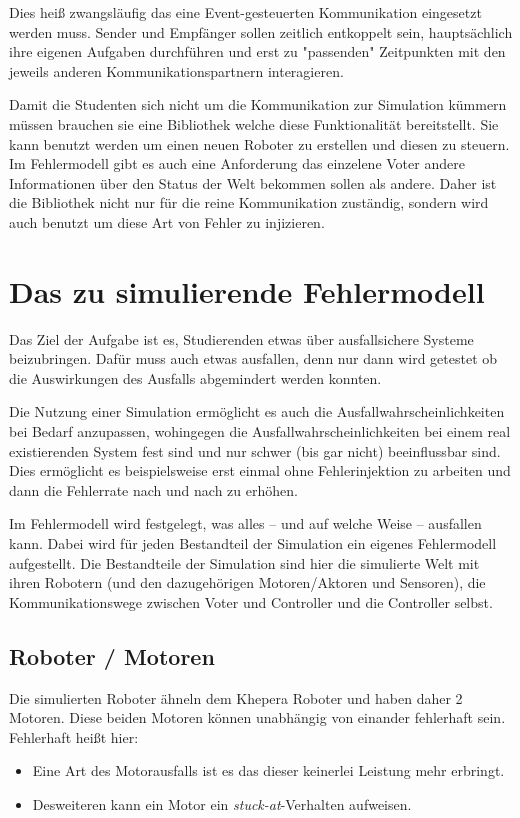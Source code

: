 Dies hei{\ss} zwangsl{\"{a}}ufig das eine Event-gesteuerten Kommunikation eingesetzt werden muss. Sender und Empf{\"{a}}nger
sollen zeitlich entkoppelt sein, haupts{\"{a}}chlich ihre eigenen Aufgaben durchf{\"{u}}hren und erst zu "passenden" Zeitpunkten
mit den jeweils anderen Kommunikationspartnern interagieren. 

Damit die Studenten sich nicht um die Kommunikation zur Simulation k{\"{u}}mmern m{\"{u}}ssen brauchen sie eine Bibliothek welche
diese Funktionalit{\"{a}}t bereitstellt. Sie kann benutzt werden um einen neuen Roboter zu erstellen und diesen zu steuern.
Im Fehlermodell gibt es auch eine Anforderung das einzelene Voter andere Informationen {\"{u}}ber den Status der Welt
bekommen sollen als andere. Daher ist die Bibliothek nicht nur f{\"{u}}r die reine Kommunikation zust{\"{a}}ndig, sondern wird auch
benutzt um diese Art von Fehler zu injizieren.

\clearpage
\section{Das zu simulierende Fehlermodell}\label{fm}
Das Ziel der Aufgabe ist es, Studierenden etwas {\"{u}}ber ausfallsichere Systeme beizubringen. Daf{\"{u}}r
muss auch etwas ausfallen, denn nur dann wird getestet ob die Auswirkungen des Ausfalls abgemindert werden 
konnten.

Die Nutzung einer Simulation erm{\"{o}}glicht es auch die Ausfallwahrscheinlichkeiten bei Bedarf
anzupassen, wohingegen die Ausfallwahrscheinlichkeiten bei einem real existierenden System fest sind und
nur schwer (bis gar nicht) beeinflussbar sind. Dies erm{\"{o}}glicht es beispielsweise erst einmal ohne
Fehlerinjektion zu arbeiten und dann die Fehlerrate nach und nach zu erh{\"{o}}hen.

Im Fehlermodell wird festgelegt, was alles -- und auf welche Weise -- ausfallen kann. Dabei wird f{\"{u}}r jeden Bestandteil der Simulation ein eigenes Fehlermodell aufgestellt. Die Bestandteile
der Simulation sind hier die simulierte Welt mit ihren Robotern (und den dazugeh{\"{o}}rigen Motoren/Aktoren
und Sensoren), die Kommunikationswege zwischen Voter und Controller und die Controller selbst.

\subsection{Roboter / Motoren}\label{fm-robot}
Die simulierten Roboter {\"{a}}hneln dem Khepera Roboter und haben daher 2 Motoren. Diese beiden Motoren k{\"{o}}nnen unabh{\"{a}}ngig von einander fehlerhaft sein. Fehlerhaft
hei{\ss}t hier:
\begin{itemize}
	\item Eine Art des Motorausfalls ist es das dieser keinerlei Leistung mehr erbringt.
	\item Desweiteren kann ein Motor ein \textit{stuck-at}-Verhalten aufweisen.
\end{itemize}

